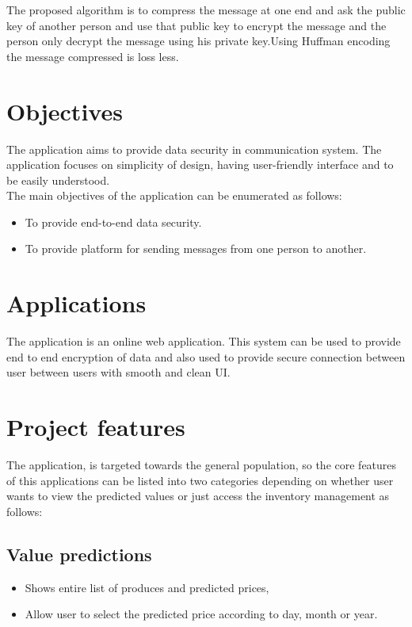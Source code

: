 The proposed algorithm is to compress the message at one end and ask the public key of another person and use that public key to encrypt the message and the person only decrypt the message using his private key.Using Huffman encoding the message compressed is loss less.


\section{Objectives}
The application aims to provide data security in communication system. The application focuses on 
simplicity of design, having user-friendly interface and to be easily understood. \\
The main objectives of the application can be enumerated as follows:
\vspace{-18pt}
\begin{itemize}
	\item To provide end-to-end data security.
	\item To provide platform for sending messages from one person to another.
\end{itemize}

\section{Applications}
The application is an online web application. This system can be used to provide end to end encryption of data and also used to provide secure connection between user between users with smooth and clean UI. 
 \section{Project features}
 The application, is targeted towards the general population, so the core features of this applications can be listed into two categories depending on whether user wants to view 
 the predicted values or just access the inventory management as follows: 

 \subsection{Value predictions}
 \vspace{-18pt}
 \begin{itemize}
	\item Shows entire list of produces and predicted prices, 
	\item Allow user to select the predicted price according to day, month or year.
\end{itemize}

